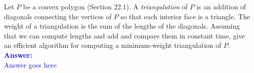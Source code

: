 \item{}
Let $P$ be a convex polygon (Section 22.1). A \emph{triangulation} of $P$ is an
addition of diagonals connecting the vertices of $P$ so that each interior face
is a triangle. The weight of a triangulation is the sum of the lengths of the
diagonals. Assuming that we can compute lengths and add and compare them in
constant time, give an efficient algorithm for computing a minimum-weight
triangulation of $P$.\\[12pt]
\ifanswers
\textcolor{blue}{
\textbf{Answer:}\\[6pt]
Answer goes here
}
\newpage
\fi

